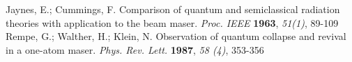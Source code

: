\documentclass[atoms,article,submit,moreauthors,pdftex,12pt,a4paper]{mdpi}
\begin{document}

\makeatletter
\renewcommand\@biblabel[1]{#1. }
\makeatother
\begin{thebibliography}{999} %
Jaynes, E.; Cummings, F. Comparison of quantum and semiclassical radiation theories with application to the beam maser. {\em Proc. IEEE} {\bf 1963}, {\em 51(1)}, 89-109
Rempe, G.; Walther, H.; Klein, N. Observation of quantum collapse and revival in a one-atom maser. {\em Phys. Rev. Lett.} {\bf 1987}, {\em 58 (4)}, 353-356

\end{thebibliography}
\end{document}
